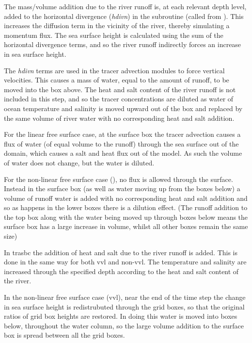 \documentclass[../main/NEMO_manual]{subfiles}
\begin{document}
The mass/volume addition due to the river runoff is, at each relevant depth level, added to
the horizontal divergence (\textit{hdivn}) in the subroutine  (called from ).
This increases the diffusion term in the vicinity of the river, thereby simulating a momentum flux.
The sea surface height is calculated using the sum of the horizontal divergence terms,
and so the river runoff indirectly forces an increase in sea surface height. 

The \textit{hdivn} terms are used in the tracer advection modules to force vertical velocities.
This causes a mass of water, equal to the amount of runoff, to be moved into the box above.
The heat and salt content of the river runoff is not included in this step,
and so the tracer concentrations are diluted as water of ocean temperature and salinity is moved upward out of
the box and replaced by the same volume of river water with no corresponding heat and salt addition.

For the linear free surface case, at the surface box the tracer advection causes a flux of water
(of equal volume to the runoff) through the sea surface out of the domain,
which causes a salt and heat flux out of the model.
As such the volume of water does not change, but the water is diluted.

For the non-linear free surface case (), no flux is allowed through the surface.
Instead in the surface box (as well as water moving up from the boxes below) a volume of runoff water is added with
no corresponding heat and salt addition and so as happens in the lower boxes there is a dilution effect.
(The runoff addition to the top box along with the water being moved up through
boxes below means the surface box has a large increase in volume, whilst all other boxes remain the same size)

In trasbc the addition of heat and salt due to the river runoff is added.
This is done in the same way for both vvl and non-vvl.
The temperature and salinity are increased through the specified depth according to
the heat and salt content of the river. 

In the non-linear free surface case (vvl),
near the end of the time step the change in sea surface height is redistrubuted through the grid boxes,
so that the original ratios of grid box heights are restored.
In doing this water is moved into boxes below, throughout the water column,
so the large volume addition to the surface box is spread between all the grid boxes.
\end{document}
